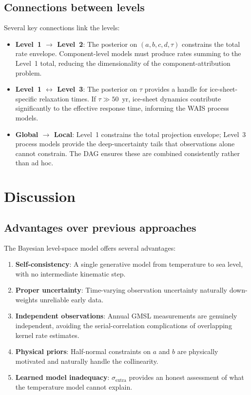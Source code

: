\documentclass[11pt]{article}
\newcommand{\sigextra}{\sigma_{\text{extra}}}
\begin{document}
\subsection{Connections between levels}

Several key connections link the levels:

\begin{itemize}
  \item \textbf{Level~1 $\to$ Level~2}: The posterior on $(a, b, c, d, \tau)$ constrains the total rate envelope.  Component-level models must produce rates summing to the Level~1 total, reducing the dimensionality of the component-attribution problem.

  \item \textbf{Level~1 $\leftrightarrow$ Level~3}: The posterior on $\tau$ provides a handle for ice-sheet-specific relaxation times.  If $\tau \gg 50$~yr, ice-sheet dynamics contribute significantly to the effective response time, informing the WAIS process models.

  \item \textbf{Global $\to$ Local}: Level~1 constrains the total projection envelope; Level~3 process models provide the deep-uncertainty tails that observations alone cannot constrain.  The DAG ensures these are combined consistently rather than ad hoc.
\end{itemize}


\section{Discussion}

\subsection{Advantages over previous approaches}

The Bayesian level-space model offers several advantages:

\begin{enumerate}
  \item \textbf{Self-consistency}: A single generative model from temperature to sea level, with no intermediate kinematic step.
  \item \textbf{Proper uncertainty}: Time-varying observation uncertainty naturally down-weights unreliable early data.
  \item \textbf{Independent observations}: Annual GMSL measurements are genuinely independent, avoiding the serial-correlation complications of overlapping kernel rate estimates.
  \item \textbf{Physical priors}: Half-normal constraints on $a$ and $b$ are physically motivated and naturally handle the collinearity.
  \item \textbf{Learned model inadequacy}: $\sigextra$ provides an honest assessment of what the temperature model cannot explain.
\end{enumerate}
\end{document}
